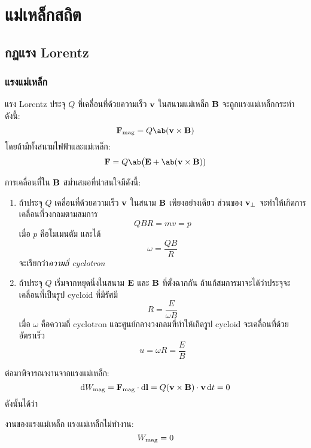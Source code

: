 \chapter{แม่เหล็กสถิต}
\section{กฎแรง Lorentz}
\subsection{แรงแม่เหล็ก}

\begin{lawbox}{แรง Lorentz}
    ประจุ $Q$ ที่เคลื่อนที่ด้วยความเร็ว $\mathbf{v}$ ในสนามแม่เหล็ก $\mathbf{B}$ จะถูกแรงแม่เหล็กกระทำดังนี้:
    \begin{equation}
        \vb{F}_\txt{mag} = Q\ab(\vb{v}\times\vb{B})
    \end{equation}
    โดยถ้ามีทั้งสนามไฟฟ้าและแม่เหล็ก:
    \begin{equation}
        \vb{F} = Q\ab\big(\vb{E} + \ab(\vb{v}\times\vb{B}))
    \end{equation}
\end{lawbox}
การเคลื่อนที่ใน $\mathbf{B}$ สม่ำเสมอที่น่าสนใจมีดังนี้:
\begin{enumerate}
    \item ถ้าประจุ $Q$ เคลื่อนที่ด้วยความเร็ว $\mathbf{v}$ ในสนาม $\mathbf{B}$ เพียงอย่างเดียว ส่วนของ $\mathbf{v}_\perp$ จะทำให้เกิดการเคลื่อนที่วงกลมตามสมการ
    \[QBR=mv=p\]
    เมื่อ $p$ คือโมเมนตัม และได้
    \[\omega = \frac{QB}{R}\]
    จะเรียกว่า\emph{ความถี่ cyclotron}
    \item ถ้าประจุ $Q$ เริ่มจากหยุดนิ่งในสนาม $\mathbf{E}$ และ $\mathbf{B}$ ที่ตั้งฉากกัน ถ้าแก้สมการมาจะได้ว่าประจุจะเคลื่อนที่เป็นรูป cycloid ที่มีรัศมี
    \[R=\frac{E}{\omega B}\]
    เมื่อ $\omega$ คือความถี่ cyclotron และศูนย์กลางวงกลมที่ทำให้เกิดรูป cycloid จะเคลื่อนที่ด้วยอัตราเร็ว
    \[u=\omega R=\frac{E}{B}\]
\end{enumerate}
ต่อมาพิจารณางานจากแรงแม่เหล็ก:
\[\odif{W}_\txt{mag}=\vb{F}_\txt{mag}\cdot\odif{\vb{l}}=Q(\vb{v}\times\vb{B})\cdot\vb{v}\odif{t}=0\]
ดังนั้นได้ว่า
\begin{corbox}{งานของแรงแม่เหล็ก}
    แรงแม่เหล็กไม่ทำงาน:
    \begin{equation}
        W_{\mathrm{mag}}=0
    \end{equation}
\end{corbox}

